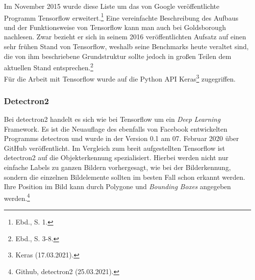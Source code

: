 \documentclass[a4paper,12pt,ngerman]{article}
\begin{document}
Im November 2015 wurde diese Liste um das von Google veröffentlichte Programm Tensorflow erweitert.\footnote{Ebd., S. 1.}  Eine vereinfachte Beschreibung des Aufbaus und der Funktionsweise von Tensorflow kann man auch bei Goldsborough nachlesen. Zwar bezieht er sich in seinem 2016 veröffentlichten Aufsatz auf einen sehr frühen Stand von Tensorflow, weshalb seine Benchmarks heute veraltet sind, die von ihm beschriebene Grundstruktur sollte jedoch in großen Teilen dem aktuellen Stand entsprechen.\footnote{Ebd., S. 3-8.} \\
Für die Arbeit mit Tensorflow wurde auf die Python API Keras\footnote{Keras (17.03.2021).} zugegriffen. \\

\subsubsection{Detectron2}
Bei detectron2 handelt es sich wie bei Tensorflow um ein \textit{Deep Learning} Framework. Es ist die Neuauflage des ebenfalls von Facebook entwickelten Programms detectron und wurde in der Version 0.1 am 07. Februar 2020 über GitHub veröffentlicht. Im Vergleich zum breit aufgestellten Tensorflow ist detectron2 auf die Objekterkennung spezialisiert. Hierbei werden nicht nur einfache Labels zu ganzen Bildern vorhergesagt, wie bei der Bilderkennung, sondern die einzelnen Bildelemente sollten im besten Fall schon erkannt werden. Ihre Position im Bild kann durch Polygone und \textit{Bounding Boxes} angegeben werden.\footnote{Github, detectron2 (25.03.2021).} \\
\end{document}

